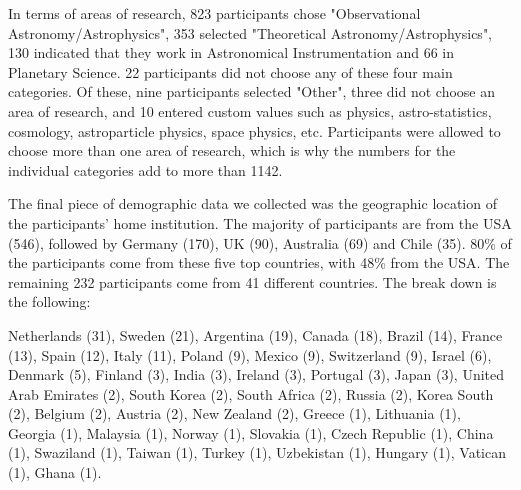 In terms of areas of research, 823 participants chose "Observational Astronomy/Astrophysics", 353 selected "Theoretical Astronomy/Astrophysics", 130 indicated that they work in Astronomical Instrumentation and 66 in Planetary Science. 22 participants did not choose any of these four main categories. Of these, nine participants selected "Other", three did not choose an area of research, and 10 entered custom values such as physics, astro-statistics, cosmology, astroparticle physics, space physics, etc. Participants were allowed to choose more than one area of research, which is why the numbers for the individual categories add to more than 1142. 

The final piece of demographic data we collected was the geographic location of the participants' home institution. The majority of participants are from the USA (546), followed by Germany (170), UK (90), Australia (69) and Chile (35). 80\% of the participants come from these five top countries, with 48\% from the USA. The remaining 232 participants come from 41 different countries. The break down is the following:

             Netherlands     (31),
                  Sweden     (21),
               Argentina     (19),
                  Canada     (18),
                  Brazil     (14),
                  France     (13),
                   Spain     (12),
                   Italy     (11),
                  Poland      (9),
                  Mexico      (9),
             Switzerland      (9),
                  Israel      (6),
                 Denmark      (5),
                 Finland      (3),
                   India      (3),
                 Ireland      (3),
                Portugal      (3),
                   Japan      (3),
    United Arab Emirates      (2),
             South Korea      (2),
            South Africa      (2),
                  Russia      (2),
             Korea South      (2),
                 Belgium      (2),
                 Austria      (2),
             New Zealand      (2),
                  Greece      (1),
               Lithuania      (1),
                 Georgia      (1),
                Malaysia      (1),
                  Norway      (1),
                Slovakia      (1),
          Czech Republic      (1),
                   China      (1),
               Swaziland      (1),
                  Taiwan      (1),
                  Turkey      (1),
              Uzbekistan      (1),
                 Hungary      (1),
                Vatican       (1),
                   Ghana      (1).
                   
